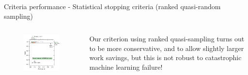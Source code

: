 \documentclass[9pt, aspectratio=169]{beamer}
\begin{document}
\begin{frame}{Criteria performance - Statistical stopping criteria (ranked quasi-random sampling)}

\begin{columns}
	\begin{column}{0.5\linewidth}
		\begin{figure}
			\includegraphics[width=\linewidth]{../manuscript/2_figs_jointplot_nrs.pdf}
			
		\end{figure}
	\end{column}
	\begin{column}{0.5\linewidth}
		Our criterion using ranked quasi-sampling turns out to be more conservative, and to allow slightly larger work savings, but this is not robust to catastrophic machine learning failure!
		
	\end{column}
\end{columns}

\end{frame}
\end{document}
